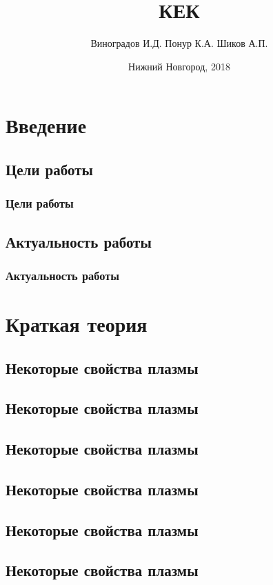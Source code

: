 \documentclass[10pt,pdf,hyperref={unicode}, dvipsnames]{beamer}
\title[КЕК]{КЕК}
\author{%
	Виноградов И.Д. %
	Понур К.А. %
	Шиков А.П. %
}
\institute{Радиофизический факультет ННГУ, 430 группа}
\date{Нижний Новгород, 2018}
\begin{document}
  
\begin{frame}
\titlepage
\end{frame}


\section{Введение}
\subsection{Цели работы}
\begin{frame}[t]
	\frametitle{Цели работы}
	
\end{frame}


\subsection{Актуальность работы}

\begin{frame}[t]
	\frametitle{Актуальность работы}
\end{frame}


\section{Краткая теория}

\subsection{Некоторые свойства плазмы}
\begin{frame}[t]

\end{frame}

\subsection{Некоторые свойства плазмы}


\subsection{Некоторые свойства плазмы}


\subsection{Некоторые свойства плазмы}


\subsection{Некоторые свойства плазмы}


\subsection{Некоторые свойства плазмы}
\end{document}
